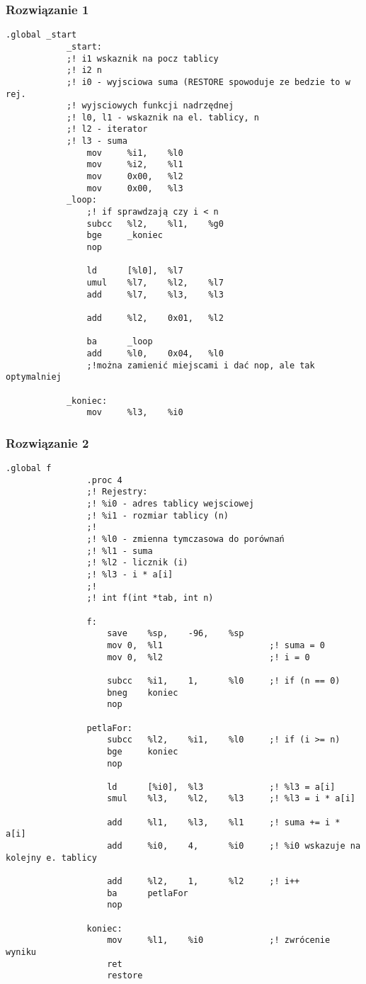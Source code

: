 		\subsubsection{Rozwiązanie 1}
			\begin{lstlisting}[language={[sparc]Assembler}]
			.global _start
			_start:
			;! i1 wskaznik na pocz tablicy
			;! i2 n
			;! i0 - wyjsciowa suma (RESTORE spowoduje ze bedzie to w rej.
			;! wyjsciowych funkcji nadrzędnej
			;! l0, l1 - wskaznik na el. tablicy, n
			;! l2 - iterator
			;! l3 - suma
				mov		%i1,	%l0			
				mov		%i2,	%l1			
				mov		0x00,	%l2
				mov		0x00,	%l3
			_loop:
				;! if sprawdzają czy i < n
				subcc	%l2,	%l1,	%g0
				bge		_koniec
				nop
			
				ld		[%l0],	%l7
				umul	%l7, 	%l2,	%l7
				add		%l7,	%l3, 	%l3
				
				add		%l2,	0x01,	%l2
				
				ba		_loop
				add		%l0,	0x04,	%l0
				;!można zamienić miejscami i dać nop, ale tak optymalniej
			
			_koniec:
				mov		%l3,	%i0
			\end{lstlisting}
		\newpage
		\subsubsection{Rozwiązanie 2}
			\begin{lstlisting}[language={[sparc]Assembler}]
				.global f
				.proc 4
				;! Rejestry:
				;! %i0 - adres tablicy wejsciowej
				;! %i1 - rozmiar tablicy (n)
				;!
				;! %l0 - zmienna tymczasowa do porównań
				;! %l1 - suma
				;! %l2 - licznik (i)
				;! %l3 - i * a[i]
				;!
				;! int f(int *tab, int n)
				
				f:
					save	%sp,	-96,	%sp
					mov	0,	%l1						;! suma = 0
					mov	0,	%l2						;! i = 0
				
					subcc	%i1,	1,		%l0		;! if (n == 0)
					bneg	koniec
					nop
				
				petlaFor:	
					subcc	%l2,	%i1,	%l0		;! if (i >= n)
					bge		koniec
					nop
				
					ld		[%i0],	%l3				;! %l3 = a[i]
					smul	%l3,	%l2,	%l3		;! %l3 = i * a[i]
					
					add		%l1,	%l3,	%l1		;! suma += i * a[i]
					add		%i0,	4,		%i0		;! %i0 wskazuje na kolejny e. tablicy
					
					add		%l2,	1,		%l2		;! i++
					ba		petlaFor
					nop
				
				koniec:
					mov		%l1,	%i0				;! zwrócenie wyniku
					ret
					restore
			\end{lstlisting}